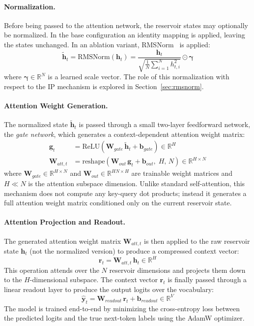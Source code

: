 \documentclass{sapthesis}
\begin{document}
\paragraph{Normalization.}
Before being passed to the attention network, the reservoir states may optionally be normalized. In the base configuration an identity mapping is applied, leaving the states unchanged. In an ablation variant, RMSNorm~\cite{zhang2019root} is applied:
\[
  \tilde{\mathbf{h}}_t = \text{RMSNorm}(\mathbf{h}_t) = \frac{\mathbf{h}_t}{\sqrt{\frac{1}{N}\sum_{i=1}^{N} h_{t,i}^2}} \odot \boldsymbol{\gamma}
\]
where $\boldsymbol{\gamma} \in \mathbb{R}^N$ is a learned scale vector. The role of this normalization with respect to the IP mechanism is explored in Section~\ref{sec:rmsnorm}.

\paragraph{Attention Weight Generation.}
The normalized state $\tilde{\mathbf{h}}_t$ is passed through a small two-layer feedforward network, the \textit{gate network}, which generates a context-dependent attention weight matrix:
\begin{align}
  \mathbf{g}_t       & = \text{ReLU}\!\left(\mathbf{W}_{gate}\,\tilde{\mathbf{h}}_t + \mathbf{b}_{gate}\right) \in \mathbb{R}^H \\
  \mathbf{W}_{att,t} & = \text{reshape}\!\left(\mathbf{W}_{out}\,\mathbf{g}_t + \mathbf{b}_{out},\; H,\, N\right)\in \mathbb{R}^{H \times N}
\end{align}
where $\mathbf{W}_{gate} \in \mathbb{R}^{H \times N}$ and $\mathbf{W}_{out} \in \mathbb{R}^{HN \times H}$ are trainable weight matrices and $H \ll N$ is the attention subspace dimension. Unlike standard self-attention, this mechanism does not compute any key-query dot products; instead it generates a full attention weight matrix conditioned only on the current reservoir state.

\paragraph{Attention Projection and Readout.}
The generated attention weight matrix $\mathbf{W}_{att,t}$ is then applied to the raw reservoir state $\mathbf{h}_t$ (not the normalized version) to produce a compressed context vector:
\[
  \mathbf{r}_t = \mathbf{W}_{att,t}\,\mathbf{h}_t \in \mathbb{R}^H
\]
This operation attends over the $N$ reservoir dimensions and projects them down to the $H$-dimensional subspace. The context vector $\mathbf{r}_t$ is finally passed through a linear readout layer to produce the output logits over the vocabulary:
\[
  \hat{\mathbf{y}}_t = \mathbf{W}_{readout}\,\mathbf{r}_t + \mathbf{b}_{readout} \in \mathbb{R}^V
\]
The model is trained end-to-end by minimizing the cross-entropy loss between the predicted logits and the true next-token labels using the AdamW optimizer.
\end{document}
